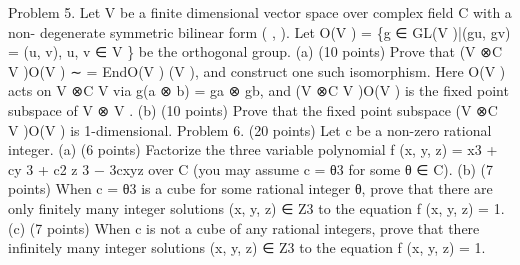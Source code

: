 \documentclass[UTF8,12pt]{ctexart}
\begin{document}
Problem 5. Let V be a finite dimensional vector space over complex field C with a non- degenerate symmetric bilinear form ( , ). Let O(V ) = \{g ∈ GL(V )|(gu, gv) = (u, v), u, v ∈ V \} be the orthogonal group. (a) (10 points) Prove that (V ⊗C V )O(V ) ∼ = EndO(V ) (V ), and construct one such isomorphism. Here O(V ) acts on V ⊗C V via g(a ⊗ b) = ga ⊗ gb, and (V ⊗C V )O(V ) is the fixed point subspace of V ⊗ V . (b) (10 points) Prove that the fixed point subspace (V ⊗C V )O(V ) is 1-dimensional. Problem 6. (20 points) Let c be a non-zero rational integer. (a) (6 points) Factorize the three variable polynomial f (x, y, z) = x3 + cy 3 + c2 z 3 − 3cxyz over C (you may assume c = θ3 for some θ ∈ C). (b) (7 points) When c = θ3 is a cube for some rational integer θ, prove that there are only finitely many integer solutions (x, y, z) ∈ Z3 to the equation f (x, y, z) = 1. (c) (7 points) When c is not a cube of any rational integers, prove that there infinitely many integer solutions (x, y, z) ∈ Z3 to the equation f (x, y, z) = 1.
\end{document}
